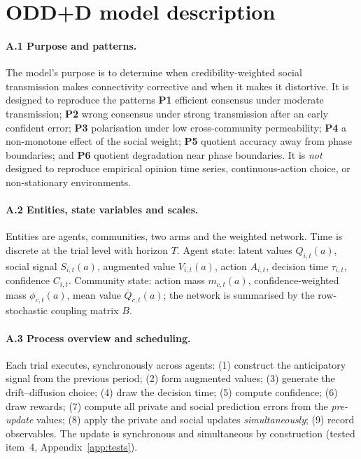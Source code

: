 \documentclass[11pt]{article}
\newcommand{\1}{\mathbf{1}}
\begin{document}
\section{ODD+D model description}
\label{app:odd}

\paragraph{A.1 Purpose and patterns.}
The model's purpose is to determine when credibility-weighted social
transmission makes connectivity corrective and when it makes it distortive. It
is designed to reproduce the patterns \textbf{P1} efficient consensus under
moderate transmission; \textbf{P2} wrong consensus under strong transmission
after an early confident error; \textbf{P3} polarisation under low cross-community
permeability; \textbf{P4} a non-monotone effect of the social weight; \textbf{P5}
quotient accuracy away from phase boundaries; and \textbf{P6} quotient
degradation near phase boundaries. It is \emph{not} designed to reproduce
empirical opinion time series, continuous-action choice, or non-stationary
environments.

\paragraph{A.2 Entities, state variables and scales.}
Entities are agents, communities, two arms and the weighted network. Time is
discrete at the trial level with horizon $T$. Agent state: latent values
$Q_{i,t}(a)$, social signal $S_{i,t}(a)$, augmented value $V_{i,t}(a)$, action
$A_{i,t}$, decision time $\tau_{i,t}$, confidence $C_{i,t}$. Community state:
action mass $m_{c,t}(a)$, confidence-weighted mass $\phi_{c,t}(a)$, mean value
$\bar Q_{c,t}(a)$; the network is summarised by the row-stochastic coupling
matrix $B$.

\paragraph{A.3 Process overview and scheduling.}
Each trial executes, synchronously across agents: (1) construct the anticipatory
signal from the previous period; (2) form augmented values; (3) generate the
drift--diffusion choice; (4) draw the decision time; (5) compute confidence;
(6) draw rewards; (7) compute all private and social prediction errors from the
\emph{pre-update} values; (8) apply the private and social updates
\emph{simultaneously}; (9) record observables. The update is synchronous and
simultaneous by construction (tested item~4, Appendix~\ref{app:tests}).
\end{document}
